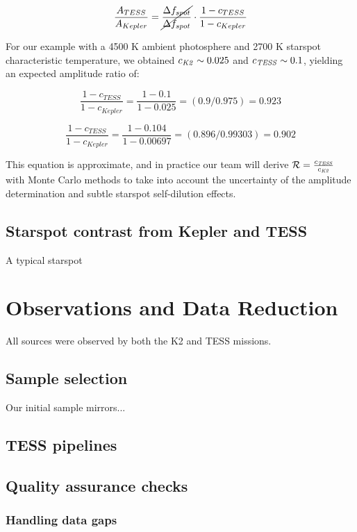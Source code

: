 \documentclass[twocolumn]{aastex631}
\newcommand{\tess}{{\it TESS}}
\newcommand{\ktwo}{{\it K2}}
\begin{document}
$$ \frac{A_{TESS}}{A_{Kepler}} = \cancel{\frac{\Delta f_{spot}}{\Delta f_{spot}}} \cdot \frac{1-c_{TESS}}{1-c_{Kepler}} $$

For our example with a 4500 K ambient photosphere and 2700 K starspot characteristic temperature, we obtained $c_{\ktwo}\sim0.025$ and $c_{\tess}\sim0.1$, yielding an expected amplitude ratio of:

$$\frac{1-c_{TESS}}{1-c_{Kepler}} = \frac{1-0.1}{1-0.025}  = (0.9/0.975)=0.923$$


$$\frac{1-c_{TESS}}{1-c_{Kepler}} = \frac{1-0.104}{1-0.00697}  = (0.896/0.99303)=0.902$$


This equation is approximate, and in practice our team will derive $\mathcal{R}= \frac{c_{\tess}}{c_{\ktwo}}$ with Monte Carlo methods to take into account the uncertainty of the amplitude determination and subtle starspot self-dilution effects.




\subsection{Starspot contrast from Kepler and TESS}
A typical starspot

\section{Observations and Data Reduction}

All sources were observed by both the K2 \citep{howell14} and TESS \citep{2015JATIS...1a4003R} missions.

\subsection{Sample selection}
Our initial sample mirrors...

\subsection{TESS pipelines}


\subsection{Quality assurance checks}

\subsubsection{Handling data gaps}
\end{document}
